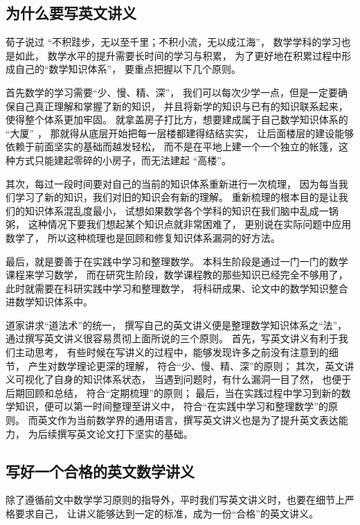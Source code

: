 
\subsection{为什么要写英文讲义}

荀子说过 “不积跬步，无以至千里；不积小流，无以成江海”，
数学学科的学习也是如此，
数学水平的提升需要长时间的学习与积累，
为了更好地在积累过程中形成自己的“数学知识体系”，
要重点把握以下几个原则。

首先数学的学习需要“少、慢、精、深”，
我们可以每次少学一点，但是一定要确保自己真正理解和掌握了新的知识，
并且将新学的知识与已有的知识联系起来，使得整个体系更加牢固。
就拿盖房子打比方，想要建成属于自己数学知识体系的 “大厦” ，
那就得从底层开始把每一层楼都建得结结实实，
让后面楼层的建设能够依赖于前面坚实的基础而越发轻松，
而不是在平地上建一个一个独立的帐篷，这种方式只能建起零碎的小房子，而无法建起 “高楼”。

其次，每过一段时间要对自己的当前的知识体系重新进行一次梳理，
因为每当我们学习了新的知识，我们对旧的知识会有新的理解。
重新梳理的根本目的是让我们的知识体系混乱度最小，
试想如果数学各个学科的知识在我们脑中乱成一锅粥，
这种情况下要我们想起某个知识点就非常困难了，
更别说在实际问题中应用数学了，
所以这种梳理也是回顾和修复知识体系漏洞的好方法。

最后，就是要善于在实践中学习和整理数学。
本科生阶段是通过一门一门的数学课程来学习数学，
而在研究生阶段，数学课程教的那些知识已经完全不够用了，
此时就需要在科研实践中学习和整理数学，
将科研成果、论文中的数学知识整合进数学知识体系中。

道家讲求“道法术”的统一，
撰写自己的英文讲义便是整理数学知识体系之“法”，
通过撰写英文讲义很容易贯彻上面所说的三个原则。
首先，写英文讲义有利于我们主动思考，
有些时候在写讲义的过程中，能够发现许多之前没有注意到的细节，
产生对数学理论更深的理解，
符合“少、慢、精、深”的原则；
其次，英文讲义可视化了自身的知识体系状态，
当遇到问题时，有什么漏洞一目了然，
也便于后期回顾和总结，
符合“定期梳理”的原则；
最后，当在实践过程中学习到新的数学知识，便可以第一时间整理至讲义中，
符合“在实践中学习和整理数学”的原则。
而英文作为当前数学界的通用语言，撰写英文讲义也是为了提升英文表达能力，
为后续撰写英文论文打下坚实的基础。

\subsection{写好一个合格的英文数学讲义}

除了遵循前文中数学学习原则的指导外，平时我们写英文讲义时，也要在细节上严格要求自己，
让讲义能够达到一定的标准，成为一份“合格”的英文讲义。

